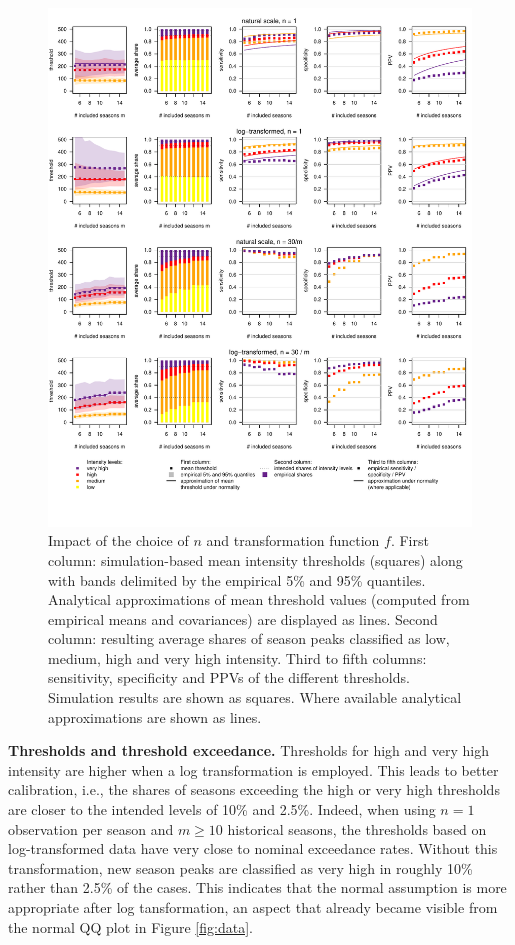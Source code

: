 \documentclass{article}
\begin{document}
\begin{figure}[h!]
\centering
\includegraphics[width=1\textwidth]{figure/plot_fr.pdf}

\vspace{-1.5cm}

\caption{Impact of the choice of $n$ and transformation function $f$. First column: simulation-based mean intensity thresholds (squares) along with bands delimited by the empirical 5\% and 95\% quantiles. Analytical approximations of mean threshold values (computed from empirical means and covariances) are displayed as lines. Second column: resulting average shares of season peaks classified as low, medium, high and very high intensity. Third to fifth columns: sensitivity, specificity and PPVs of the different thresholds. Simulation results are shown as squares. Where available analytical approximations are shown as lines.}
\label{fig:results1}
\end{figure}

\textbf{Thresholds and threshold exceedance.} Thresholds for high and very high intensity are higher when a log transformation is employed. This leads to better calibration, i.e., the shares of seasons exceeding the high or very high thresholds are closer to the intended levels of 10\% and 2.5\%. Indeed, when using $n = 1$ observation per season and $m \geq 10$ historical seasons, the thresholds based on log-transformed data have very close to nominal exceedance rates. Without this transformation, new season peaks are classified as very high in roughly 10\% rather than 2.5\% of the cases. This indicates that the normal assumption is more appropriate after log tansformation, an aspect that already became visible from the normal QQ plot in Figure \ref{fig:data}.
\end{document}
